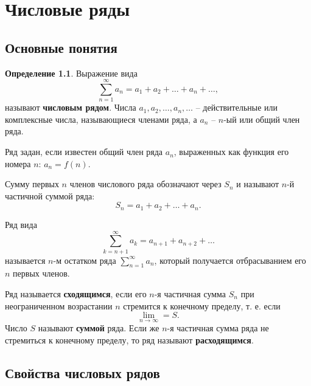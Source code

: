 \documentclass[a5paper, 11pt]{extbook}
\theoremstyle{definition}
\theoremstyle{definition}
\theoremstyle{definition}
\newtheorem*{definition*}{Определение}
\begin{document}
\chapter{Числовые ряды}

\section{Основные понятия}

\begin{definition*}
    Выражение вида
    \[
        \sum_{n = 1}^{\infty} a_n = a_1 + a_2 + \ldots + a_n + \ldots,
    \]
    называют \textbf{числовым рядом}. Числа \(a_1, a_2, \ldots, a_n, \ldots\) -- действительные или комплексные числа, называющиеся членами ряда, а \(a_n\) -- \(n\)-ый или общий член ряда.
\end{definition*}

Ряд задан, если известен общий член ряда \(a_n\), выраженных как функция его номера \(n\): \(a_n = f(n)\).

Сумму первых \(n\) членов числового ряда обозначают через \(S_n\) и называют \(n\)-й частичной суммой ряда:
\[
    S_n = a_1 + a_2 + \ldots + a_n.
\]

Ряд вида
\[
    \sum_{k = n + 1}^{\infty} a_k = a_{n + 1} + a_{n + 2} + \ldots
\]
называется \(n\)-м остатком ряда \(\displaystyle \sum_{n = 1}^{\infty} a_n\), который получается отбрасыванием его \(n\) первых членов.

Ряд называется \textbf{сходящимся}, если его \(n\)-я частичная сумма \(S_n\) при неограниченном возрастании \(n\) стремится к конечному пределу, т. е. если
\[
    \lim_{n \to \infty} = S.
\]
Число \(S\) называют \textbf{суммой} ряда. Если же \(n\)-я частичная сумма ряда не стремиться к конечному пределу, то ряд называют \textbf{расходящимся}.

\section{Свойства числовых рядов}
\end{document}
